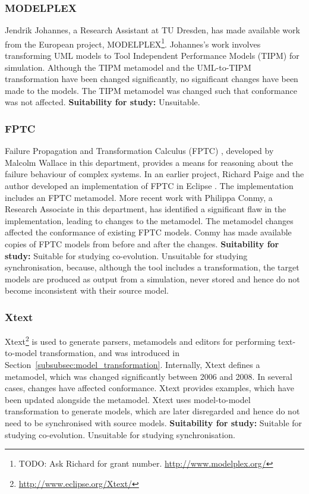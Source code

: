 \subsubsection{MODELPLEX}
Jendrik Johannes, a Research Assistant at TU Dresden, has made available work from the European project, MODELPLEX\footnote{TODO: Ask Richard for grant number. \url{http://www.modelplex.org/}}. Johannes's work involves transforming UML models to Tool Independent Performance Models (TIPM) for simulation. Although the TIPM metamodel and the UML-to-TIPM transformation have been changed significantly, no significant changes have been made to the models. The TIPM metamodel was changed such that conformance was not affected. \textbf{Suitability for study:} Unsuitable.

\subsubsection{FPTC}
Failure Propagation and Transformation Calculus (FPTC) \cite{wallace05modular}, developed by Malcolm Wallace in this department, provides a means for reasoning about the failure behaviour of complex systems. In an earlier project, Richard Paige and the author developed an implementation of FPTC in Eclipse \cite{paige08fptc}. The implementation includes an FPTC metamodel. More recent work with Philippa Conmy, a Research Associate in this department, has identified a significant flaw in the implementation, leading to changes to the metamodel. The metamodel changes affected the conformance of existing FPTC models. Conmy has made available copies of FPTC models from before and after the changes. \textbf{Suitability for study:} Suitable for studying co-evolution. Unsuitable for studying synchronisation, because, although the tool includes a transformation, the target models are produced as output from a simulation, never stored and hence do not become inconsistent with their source model.

\subsubsection{Xtext}
Xtext\footnote{\url{http://www.eclipse.org/Xtext/}} is used to generate parsers, metamodels and editors for performing text-to-model transformation, and was introduced in Section~\ref{subsubsec:model_transformation}. Internally, Xtext defines a metamodel, which was changed significantly between 2006 and 2008. In several cases, changes have affected conformance. Xtext provides examples, which have been updated alongside the metamodel. Xtext uses model-to-model transformation to generate models, which are later disregarded and hence do not need to be synchronised with source models. \textbf{Suitability for study:} Suitable for studying co-evolution. Unsuitable for studying synchronisation.

